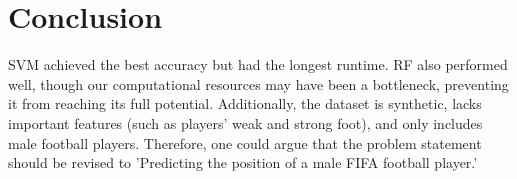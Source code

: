 \section{Conclusion}
SVM achieved the best accuracy but had the longest runtime. RF also performed well, though our computational resources may have been a bottleneck, preventing it from reaching its full potential.
Additionally, the dataset is synthetic, lacks important features (such as players' weak and strong foot), and only includes male football players. 
Therefore, one could argue that the problem statement should be revised to 'Predicting the position of a male FIFA football player.'